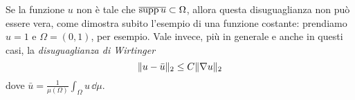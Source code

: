 Se la funzione $u$ non è tale che $\overline{\operatorname{supp} u}\subset\Omega$, allora questa disuguaglianza non può essere vera, come dimostra subito l'esempio di una funzione costante: prendiamo $u=1$ e $\Omega=(0,1)$, per esempio.
Vale invece, più in generale e anche in questi casi, la \emph{disuguaglianza di Wirtinger}
\begin{equation}
    \lVert u-\bar{u}\rVert_2\le C\lVert\nabla u\rVert_2
    \label{eq:disuguaglianza-wirtinger}
\end{equation}
dove $\bar{u}=\frac1{\mu(\Omega)}\int_\Omega u\,\dd\mu$.
